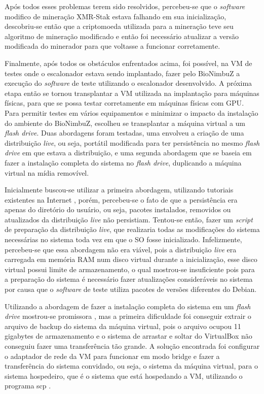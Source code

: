Após todos esses problemas terem sido resolvidos, percebeu-se que o \textit{software} modifico de mineração XMR-Stak estava falhando em sua inicialização, descobriu-se então que a criptomoeda utilizada para a mineração teve seu algoritmo de mineração modificado e então foi necessário atualizar a versão modificada do minerador para que voltasse a funcionar corretamente.

Finalmente, após todos os obstáculos enfrentados acima, foi possível, na \acrshort{VM} de testes onde o escalonador estava sendo implantado, fazer pelo BioNimbuZ a execução do \textit{software} de teste utilizando o escalonador desenvolvido. A próxima etapa então se tornou transplantar a \acrshort{VM} utilizada na implantação para máquinas físicas, para que se possa testar corretamente em máquinas físicas com \acrshort{GPU}. Para permitir testes em vários equipamentos e minimizar o impacto da instalação do ambiente do BioNimbuZ, escolheu se transplantar a máquina virtual a um \textit{flash drive}. Duas abordagens foram testadas, uma envolveu a criação de uma distribuição \textit{live}, ou seja, portátil modificada para ter persistência no mesmo \textit{flash drive} em que estava a distribuição, e uma segunda abordagem que se baseia em fazer a instalação completa do sistema no \textit{flash drive}, duplicando a máquina virtual na mídia removível.

Inicialmente buscou-se utilizar a primeira abordagem, utilizando tutoriais existentes na Internet \cite{PersistantDebianLive} \cite{PersistantDebianLive2}, porém, percebeu-se o fato de que a persistência era apenas do diretório do usuário, ou seja, pacotes instalados, removidos ou atualizados da distribuição \textit{live} não persistiam. Tentou-se então, fazer um \textit{script} de preparação da distribuição \textit{live}, que realizaria todas as modificações do sistema necessárias no sistema toda vez em que o \acrfull{SO} fosse inicializado. Infelizmente, percebeu-se que essa abordagem não era viável, pois a distribuição \textit{live} era carregada em memória  \acrshort{RAM} num disco virtual durante a inicialização, esse disco virtual possui limite de armazenamento, o qual mostrou-se insuficiente pois para a preparação do sistema é necessário fazer atualizações consideráveis no sistema por causa que o \textit{software} de teste utiliza pacotes de versões diferentes do Debian.

Utilizando a abordagem de fazer a instalação completa do sistema em um \textit{flash drive} mostrou-se promissora \cite{DuplicarSistema}, mas a primeira dificuldade foi conseguir extrair o arquivo de backup do sistema da máquina virtual, pois o arquivo ocupou 11 gigabytes de armazenamento e o sistema de arrastar e soltar do VirtualBox não conseguiu fazer uma transferência tão grande. A solução encontrada foi configurar o adaptador de rede da \acrshort{VM} para funcionar em modo bridge \cite{NetworkVirtualBox} e fazer a transferência do sistema convidado, ou seja, o sistema da máquina virtual, para o sistema hospedeiro, que é o sistema que está hospedando a \acrshort{VM}, utilizando o programa scp \cite{LinuxSCP}.

